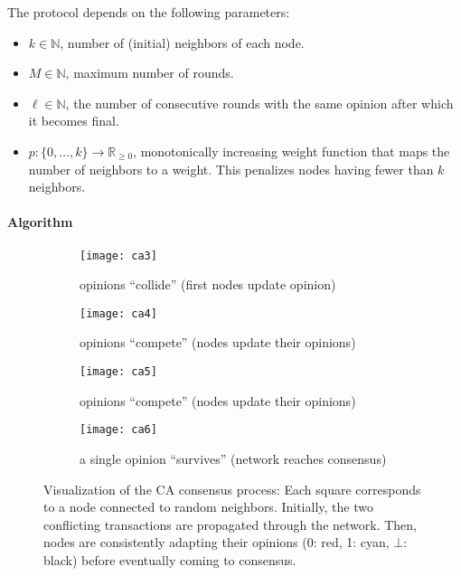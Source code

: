 \documentclass[../main.tex]{subfiles}
\begin{document}
The protocol depends on the following parameters:
\begin{itemize}
	\item $k \in \mathbb{N}$, number of (initial) neighbors of each node.
	\item $M \in \mathbb{N}$, maximum number of rounds.
	\item $\ell \in \mathbb{N}$, the number of consecutive rounds with the same opinion after which it becomes final.
	\item $p : \{0,\dots,k\} \to \mathbb{R}_{\geq 0}$, monotonically increasing weight function that maps the number of neighbors to a weight. This penalizes nodes having fewer than $k$ neighbors.
\end{itemize}

\paragraph{Algorithm}

\begin{figure}[h]
	\captionsetup[sub]{font=footnotesize}
	\centering
	\hfill
	\begin{subfigure}[b]{0.49\linewidth}
		\texttt{[image: ca3]}
		\caption{opinions ``collide'' (first nodes update opinion)}
	\end{subfigure}
	\begin{subfigure}[b]{0.49\linewidth}
		\texttt{[image: ca4]}
		\caption{opinions ``compete'' (nodes update their opinions)}
	\end{subfigure}
	\hfill
	\begin{subfigure}[b]{0.49\linewidth}
		\texttt{[image: ca5]}
		\caption{opinions ``compete'' (nodes update their opinions)}
	\end{subfigure}
	\hfill
	\begin{subfigure}[b]{0.49\linewidth}
		\texttt{[image: ca6]}
		\caption{a single opinion ``survives'' (network reaches consensus)}
	\end{subfigure}
	\caption{Visualization of the CA consensus process:
		Each square corresponds to a node connected to random neighbors.
		Initially, the two conflicting transactions are propagated through the network.
		Then, nodes are consistently adapting their opinions (0: red, 1: cyan, $\bot$: black) before eventually coming to consensus.}
	\label{fig:ca}
\end{figure}
\end{document}
